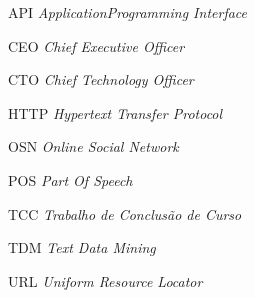 \begin{siglas}
   \item[API]{\textit{ApplicationProgramming Interface}}
   \item[CEO]{\textit{Chief Executive Officer}}
   \item[CTO]{\textit{Chief Technology Officer}}
   \item[HTTP]{\textit{Hypertext Transfer Protocol}}
   \item[OSN]{\textit{Online Social Network}}
   \item[POS]{\textit{Part Of Speech}}
   \item[TCC]{\textit{Trabalho de Conclusão de Curso}}
   \item[TDM]{\textit{Text Data Mining}}
   \item[URL]{\textit{Uniform Resource Locator}}
\end{siglas}
